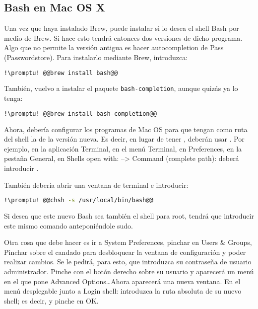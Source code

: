 \subsection{Bash en Mac OS X}\label{subsec:bash-m}
Una vez que haya instalado Brew, puede instalar si lo desea el shell Bash por medio de Brew. Si hace esto
tendrá entonces dos versiones de dicho programa. Algo que no permite la versión antigua es hacer
autocompletion de Pass (Passwordstore). Para instalarlo mediante Brew, introduzca:

\begin{lstlisting}[gobble=2,language=bash,style=bashinteract,escapechar=!]
  !\promptu! @@brew install bash@@
\end{lstlisting}

\noindent También, vuelvo a instalar el paquete \lstinline!bash-completion!, aunque quizás ya lo tenga:

\begin{lstlisting}[gobble=2,language=bash,style=bashinteract,escapechar=!]
  !\promptu! @@brew install bash-completion@@
\end{lstlisting}

\noindent Ahora, debería configurar los programas de Mac OS para que tengan como ruta del shell la de la versión
nueva.  Es decir, en lugar de tener , deberán usar . Por ejemplo, en
la aplicación Terminal, en el menú Terminal, en Preferences, en la pestaña General, en Shells open with: -->
Command (complete path): deberá introducir .

\noindent También debería abrir una ventana de terminal e introducir:

\begin{lstlisting}[gobble=2,language=bash,style=bashinteract,escapechar=!]
  !\promptu! @@chsh -s /usr/local/bin/bash@@
\end{lstlisting}

Si desea que este nuevo Bash sea también el shell para root, tendrá que introducir este mismo comando
anteponiéndole sudo.

Otra cosa que debe hacer es ir a System Preferences, pinchar en Users \& Groups, Pinchar sobre el candado para
desbloquear la ventana de configuración y poder realizar cambios. Se le pedirá, para esto, que introduzca su
contraseña de usuario administrador. Pinche con el botón derecho sobre su usuario y aparecerá un menú en el
que pone Advanced Options\ldots Ahora aparecerá una nueva ventana. En el menú desplegable junto a Login shell:
introduzca la ruta absoluta de su nuevo shell; es decir,  y pinche en OK.
